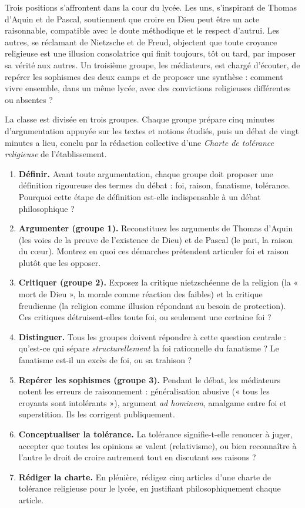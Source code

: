 \documentclass[11pt]{article}
\newcounter{popsec}
\newcounter{popsub}
\newcommand{\courssub}[1]{%
  \stepcounter{popsub}%
  \par\vspace{9pt}\noindent{\popxbold\fontsize{11.5}{13}\selectfont\color{popink}{\color{poporange}\thepopsec.\thepopsub}\hspace{6pt}#1}\par\nopagebreak\vspace{4pt}
}
\begin{document}
Trois positions s'affrontent dans la cour du lycée. Les uns, s'inspirant de Thomas d'Aquin et de Pascal, soutiennent que croire en Dieu peut être un acte raisonnable, compatible avec le doute méthodique et le respect d'autrui. Les autres, se réclamant de Nietzsche et de Freud, objectent que toute croyance religieuse est une illusion consolatrice qui finit toujours, tôt ou tard, par imposer sa vérité aux autres. Un troisième groupe, les médiateurs, est chargé d'écouter, de repérer les sophismes des deux camps et de proposer une synthèse : comment vivre ensemble, dans un même lycée, avec des convictions religieuses différentes ou absentes ?

\courssub{Consignes}

La classe est divisée en trois groupes. Chaque groupe prépare cinq minutes d'argumentation appuyée sur les textes et notions étudiés, puis un débat de vingt minutes a lieu, conclu par la rédaction collective d'une \emph{Charte de tolérance religieuse} de l'établissement.

\begin{enumerate}
  \item \textbf{Définir.} Avant toute argumentation, chaque groupe doit proposer une définition rigoureuse des termes du débat : foi, raison, fanatisme, tolérance. Pourquoi cette étape de définition est-elle indispensable à un débat philosophique ?
  \item \textbf{Argumenter (groupe 1).} Reconstituez les arguments de Thomas d'Aquin (les voies de la preuve de l'existence de Dieu) et de Pascal (le pari, la raison du cœur). Montrez en quoi ces démarches prétendent articuler foi et raison plutôt que les opposer.
  \item \textbf{Critiquer (groupe 2).} Exposez la critique nietzschéenne de la religion (la « mort de Dieu », la morale comme réaction des faibles) et la critique freudienne (la religion comme illusion répondant au besoin de protection). Ces critiques détruisent-elles toute foi, ou seulement une certaine foi ?
  \item \textbf{Distinguer.} Tous les groupes doivent répondre à cette question centrale : qu'est-ce qui sépare \emph{structurellement} la foi rationnelle du fanatisme ? Le fanatisme est-il un excès de foi, ou sa trahison ?
  \item \textbf{Repérer les sophismes (groupe 3).} Pendant le débat, les médiateurs notent les erreurs de raisonnement : généralisation abusive (« tous les croyants sont intolérants »), argument \emph{ad hominem}, amalgame entre foi et superstition. Ils les corrigent publiquement.
  \item \textbf{Conceptualiser la tolérance.} La tolérance signifie-t-elle renoncer à juger, accepter que toutes les opinions se valent (relativisme), ou bien reconnaître à l'autre le droit de croire autrement tout en discutant ses raisons ?
  \item \textbf{Rédiger la charte.} En plénière, rédigez cinq articles d'une charte de tolérance religieuse pour le lycée, en justifiant philosophiquement chaque article.
\end{enumerate}
\end{document}
